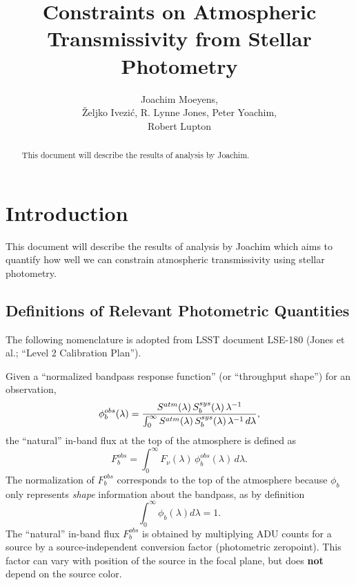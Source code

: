 \documentclass[12pt,preprint]{aastex}
\begin{document}
\title{Constraints on Atmospheric Transmissivity from Stellar Photometry}

\author{
Joachim Moeyens, \\  
{\v Z}eljko Ivezi{\'c},  R. Lynne Jones, Peter Yoachim, \\
Robert Lupton \\
}


\begin{abstract}
This document will describe the results of analysis by Joachim. 
\end{abstract}


\section{Introduction}

This document will describe the results of analysis by Joachim which aims
to quantify how well we can constrain atmospheric transmissivity using stellar photometry. 



\subsection{Definitions of Relevant Photometric Quantities} 

The following nomenclature is adopted from LSST document LSE-180 (Jones et al.; ``Level 2 Calibration Plan''). 

Given a ``normalized bandpass response function'' (or ``throughput shape'') for an observation,
\begin{equation}
\label{eqn:PhiDef}
   \phi_b^{obs}(\lambda) =  {
     {S^{atm}(\lambda)\, S_b^{sys}(\lambda) \,
       \lambda^{-1}} \over
     \int_0^\infty { {S^{atm}(\lambda) \,
         S_b^{sys}(\lambda) \, \lambda^{-1}} \,d\lambda}},
\end{equation}
the ``natural'' in-band flux at the top of the atmosphere is defined as
\begin{equation}
\label{eqn:Fb}
F_b^{obs} = \int_0^\infty {F_\nu(\lambda) \,\phi_b^{obs}(\lambda) \, d\lambda}.
\end{equation}
The normalization of $F_b^{obs}$ corresponds to the top of the atmosphere because 
$\phi_b$ only represents {\it shape} information about the bandpass, as by definition
\begin{equation}
\int_0^\infty {\phi_b(\lambda)  d\lambda}=1. 
\end{equation}
The ``natural'' in-band flux $F_b^{obs}$ is obtained by multiplying ADU counts for a source 
by a source-independent conversion factor (photometric zeropoint). This factor can vary 
with position of the source in the focal plane, but does {\bf not} depend on the source color. 
\end{document}
